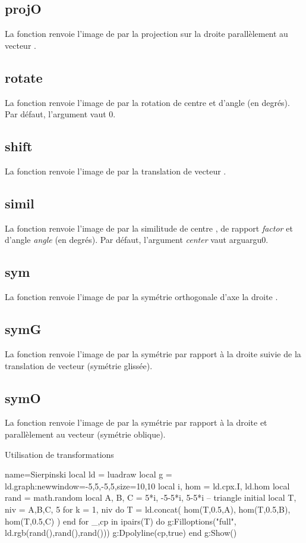 \subsection{projO}
La fonction  renvoie l'image de  par la projection sur la droite  parallèlement au vecteur .

\subsection{rotate}
La fonction  renvoie l'image de  par la rotation de centre  et d'angle  (en degrés). Par défaut, l'argument  vaut $0$.  

\subsection{shift}
La fonction  renvoie l'image de  par la translation de vecteur .

\subsection{simil}
La fonction  renvoie l'image de  par la similitude de centre , de rapport \emph{factor} et d'angle \emph{angle} (en degrés). Par défaut, l'argument \emph{center} vaut arguargu$0$.

\subsection{sym}
La fonction  renvoie l'image de  par la symétrie orthogonale d'axe la droite .

\subsection{symG}
La fonction  renvoie l'image de  par la symétrie par rapport à la droite  suivie de la translation de vecteur  (symétrie glissée).

\subsection{symO}
La fonction  renvoie l'image de  par la symétrie par rapport à la droite  et parallèlement au vecteur  (symétrie oblique).

\begin{demo}{Utilisation de transformations}
\begin{luadraw}{name=Sierpinski}
local ld = luadraw
local g = ld.graph:new{window={-5,5,-5,5},size={10,10}}
local i, hom = ld.cpx.I, ld.hom
local rand = math.random
local A, B, C = 5*i, -5-5*i, 5-5*i -- triangle initial
local T, niv = {{A,B,C}}, 5
for k = 1, niv do
    T = ld.concat( hom(T,0.5,A), hom(T,0.5,B), hom(T,0.5,C) )
end
for _,cp in ipairs(T) do
    g:Filloptions("full", ld.rgb(rand(),rand(),rand()))
    g:Dpolyline(cp,true)
end
g:Show()
\end{luadraw}
\end{demo}
